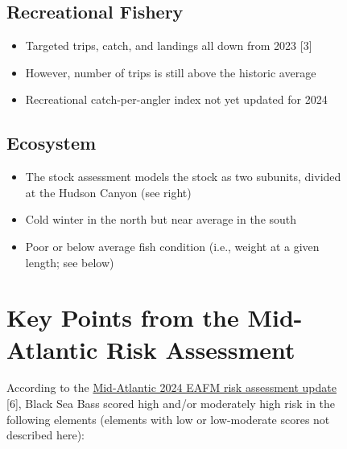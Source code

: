 \documentclass[
  10pt,
  letterpaper,
  DIV=11,
  numbers=noendperiod]{scrartcl}
\providecommand{\tightlist}{%
  \setlength{\itemsep}{0pt}\setlength{\parskip}{0pt}}\usepackage{longtable,booktabs,array}
\begin{document}
\begin{figure}
\begin{minipage}{0.57\linewidth}
\vspace{-0.25cm}
\subsection{Recreational Fishery}

\begin{itemize}
\tightlist
\item
  Targeted trips, catch, and landings all down from 2023 {[}3{]}
\item
  However, number of trips is still above the historic average
\item
  Recreational catch-per-angler index not yet updated for 2024
\end{itemize}

\vspace{-0.25cm}
\subsection{Ecosystem}

\begin{itemize}
\tightlist
\item
  The stock assessment models the stock as two subunits, divided at the
  Hudson Canyon (see right)
\item
  Cold winter in the north but near average in the south
\item
  Poor or below average fish condition (i.e., weight at a given length;
  see below)
\end{itemize}

\end{minipage}%
\newline
\begin{minipage}{\linewidth}

\vspace{0.25cm}
\section{Key Points from the Mid-Atlantic Risk Assessment}
\vspace{0.05cm}

\end{minipage}%
\newline
\begin{minipage}{0.57\linewidth}

\raggedright

According to the
\href{https://static1.squarespace.com/static/511cdc7fe4b00307a2628ac6/t/6747560a3cf66936045e5547/1732728332670/05_EAFM+Risk+Assessment.pdf}{Mid-Atlantic
2024 EAFM risk assessment update} {[}6{]}, Black Sea Bass scored high
and/or moderately high risk in the following elements (elements with low
or low-moderate scores not described here):


\end{minipage}
\end{figure}
\end{document}
